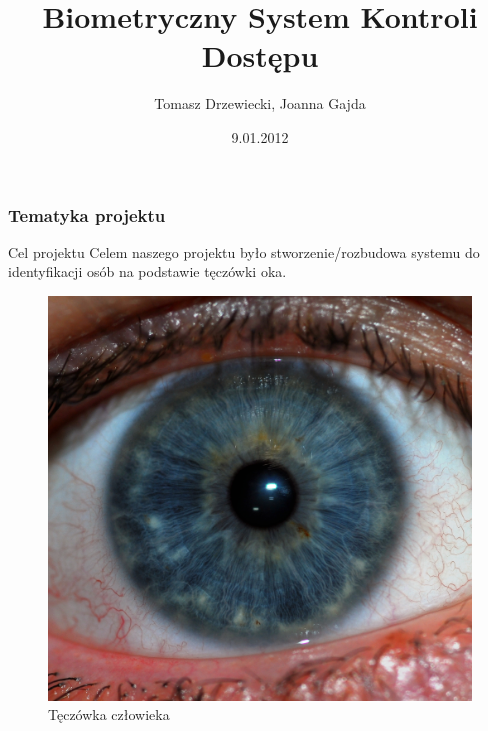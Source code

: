 \documentclass{beamer}
\title[Biometryczny System Kontroli Dostępu]{Biometryczny System Kontroli Dostępu}
\author[T. Drzewiecki, J. Gajda]{Tomasz Drzewiecki, Joanna Gajda}
\date[2012]{9.01.2012}
\institute[AGH-EAIE]
{Wydział Elektrotechniki, Automatyki, Informatyki i Elektroniki\\ 
Katedra Automatyki
}
\begin{document}
{
 \begin{frame}
   \titlepage
 \end{frame}
}


\begin{frame}
\frametitle{Tematyka projektu}

\begin{block}{Cel projektu}
Celem naszego projektu było stworzenie/rozbudowa systemu do identyfikacji osób na podstawie tęczówki oka.
\end{block}

\begin{figure}
\begin{center}
\includegraphics[scale=0.04]{teczowka.jpg}
\caption{Tęczówka człowieka}
\end{center}
\end{figure}

\end{frame}
\end{document}
